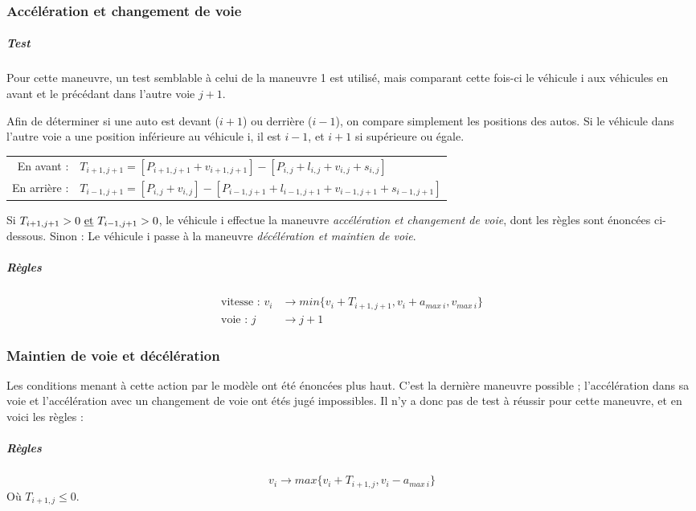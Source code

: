 \documentclass[12pt,letterpaper]{article}
\begin{document}
\subsubsection{Accélération et changement de voie}

\subparagraph{Test} Pour cette maneuvre, un test semblable à celui de la maneuvre 1 est utilisé, mais comparant cette fois-ci le véhicule i aux véhicules en avant et le précédant dans l'autre voie $j+1$.

Afin de déterminer si une auto est devant ($i+1$) ou derrière ($i-1$), on compare simplement les positions des autos. Si le véhicule dans l'autre voie a une position inférieure au véhicule i, il est $i-1$, et $i+1$ si supérieure ou égale.

\vspace{0.5cm}
\begin{tabular}{r l}
En avant : & $T_{i+1,j+1} = [P_{i+1,j+1}+v_{i+1,j+1}]-[P_{i,j}+l_{i,j}+v_{i,j}+s_{i,j}]$ \\
En arrière : & $T_{i-1,j+1} = [P_{i,j}+v_{i,j}] - [P_{i-1,j+1}+l_{i-1,j+1}+v_{i-1,j+1}+s_{i-1,j+1}]$
\end{tabular} 

\vspace{0.5cm}
Si $T_{i+1,j+1} > 0 \text{ \underline{et} } T_{i-1,j+1} > 0$, le véhicule i effectue la maneuvre \textit{accélération et changement de voie}, dont les règles sont énoncées ci-dessous. Sinon : Le véhicule i passe à la maneuvre \textit{décélération et maintien de voie}.  
\subparagraph{Règles}
\begin{equation}
\begin{split}
\text{vitesse :  } v_{i} & \rightarrow min\{v_{i}+T_{i+1,j+1}, v_{i} + a_{max\: i}, v_{max\: i}\} \\
\text{voie :  } j & \rightarrow j+1
\end{split}
\end{equation}

\subsubsection{Maintien de voie et décélération}

Les conditions menant à cette action par le modèle ont été énoncées plus haut. C'est la dernière maneuvre possible ; l'accélération dans sa voie et l'accélération avec un changement de voie ont étés jugé impossibles. Il n'y a donc pas de test à réussir pour cette maneuvre, et en voici les règles : 
\subparagraph{Règles} 
\begin{equation}
v_{i} \rightarrow max\{v_{i}+T_{i+1,j}, v_{i}-a_{max\: i}\}
\end{equation}
Où $T_{i+1,j} \leq 0$. 
\end{document}
